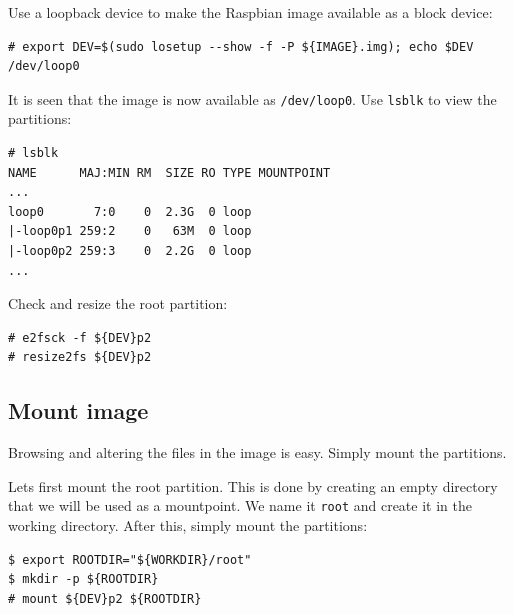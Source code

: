 Use a loopback device to make the Raspbian image available as a block device: 
\begin{lstlisting}[]
# export DEV=$(sudo losetup --show -f -P ${IMAGE}.img); echo $DEV
/dev/loop0
\end{lstlisting}
\FloatBarrier
\vspace{-5mm}

It is seen that the image is now available as \texttt{/dev/loop0}. Use \texttt{lsblk}
to view the partitions:

\begin{lstlisting}[]
# lsblk
NAME      MAJ:MIN RM  SIZE RO TYPE MOUNTPOINT
...
loop0       7:0    0  2.3G  0 loop 
|-loop0p1 259:2    0   63M  0 loop 
|-loop0p2 259:3    0  2.2G  0 loop
...
\end{lstlisting}
\FloatBarrier
\vspace{-5mm}

Check and resize the root partition:
\begin{lstlisting}[]
# e2fsck -f ${DEV}p2
# resize2fs ${DEV}p2
\end{lstlisting}
\FloatBarrier



\subsection{Mount image}

Browsing and altering the files in the image is easy. Simply mount the partitions.

Lets first mount the root partition. This is done by creating an empty directory
that we will be used as a mountpoint. We name it \texttt{root} and create it in the
working directory.
After this, simply mount the partitions:

\begin{lstlisting}[]
$ export ROOTDIR="${WORKDIR}/root"
$ mkdir -p ${ROOTDIR}
# mount ${DEV}p2 ${ROOTDIR}
\end{lstlisting}
\FloatBarrier
\vspace{-5mm}

